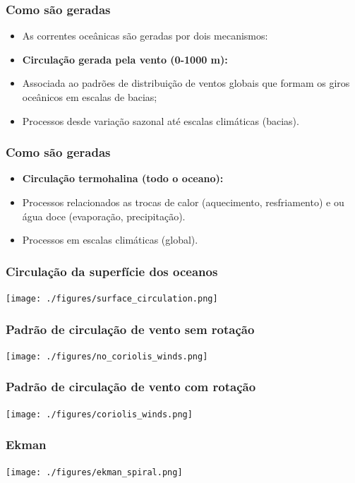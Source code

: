 \begin{frame}
\frametitle{Como são geradas}
  \begin{itemize}[<+-| alert@+>]
    \item As correntes oceânicas são geradas por dois mecanismos:
    \item {\bf Circulação gerada pela vento (0-1000 m):}
    \item Associada ao padrões de distribuição de ventos globais que formam os
          giros oceânicos em escalas de bacias;
    \item Processos desde variação sazonal até escalas climáticas (bacias).
   \end{itemize}
\end{frame}


\begin{frame}
\frametitle{Como são geradas}
  \begin{itemize}[<+-| alert@+>]
    \item {\bf Circulação termohalina (todo o oceano):}
    \item Processos relacionados as trocas de calor (aquecimento, resfriamento)
          e ou água doce (evaporação, precipitação).
    \item Processos em escalas climáticas (global).
   \end{itemize}
\end{frame}

\begin{frame}
  \frametitle{Circulação da superfície dos oceanos}
  \begin{center}
    \texttt{[image: ./figures/surface\_circulation.png]}
  \end{center}
\end{frame}

\begin{frame}
  \frametitle{Padrão de circulação de vento {\bf sem} rotação}
  \begin{center}
    \texttt{[image: ./figures/no\_coriolis\_winds.png]}
  \end{center}
\end{frame}


\begin{frame}
  \frametitle{Padrão de circulação de vento {\bf com} rotação}
  \begin{center}
    \texttt{[image: ./figures/coriolis\_winds.png]}
  \end{center}
\end{frame}


\begin{frame}
  \frametitle{Ekman}
  \begin{center}
    \texttt{[image: ./figures/ekman\_spiral.png]}
  \end{center}
\end{frame}


